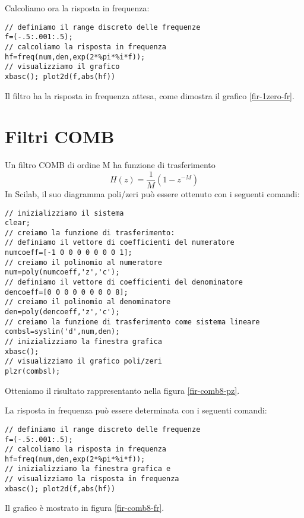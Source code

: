 Calcoliamo ora la risposta in frequenza:
\begin{verbatim}
// definiamo il range discreto delle frequenze
f=(-.5:.001:.5);
// calcoliamo la risposta in frequenza
hf=freq(num,den,exp(2*%pi*%i*f));
// visualizziamo il grafico
xbasc(); plot2d(f,abs(hf))
\end{verbatim}
Il filtro ha la risposta in frequenza attesa, come dimostra il grafico \ref{fir-1zero-fr}.


\section{Filtri COMB}
Un filtro COMB di ordine M ha funzione di trasferimento 
\begin{displaymath}
H(z)=\frac{1}{M}(1-z^{-M})
\end{displaymath}
In Scilab, il suo diagramma poli/zeri pu\`o essere ottenuto con i seguenti comandi:
\begin{verbatim}
// inizializziamo il sistema
clear;
// creiamo la funzione di trasferimento:
// definiamo il vettore di coefficienti del numeratore
numcoeff=[-1 0 0 0 0 0 0 0 1];
// creiamo il polinomio al numeratore
num=poly(numcoeff,'z','c');
// definiamo il vettore di coefficienti del denominatore
dencoeff=[0 0 0 0 0 0 0 0 8];
// creiamo il polinomio al denominatore
den=poly(dencoeff,'z','c');
// creiamo la funzione di trasferimento come sistema lineare
combsl=syslin('d',num,den);
// inizializziamo la finestra grafica
xbasc();
// visualizziamo il grafico poli/zeri
plzr(combsl);
\end{verbatim}
Otteniamo il risultato rappresentanto nella figura \ref{fir-comb8-pz}.


La risposta in frequenza pu\`o essere determinata con i seguenti comandi:
\begin{verbatim}
// definiamo il range discreto delle frequenze
f=(-.5:.001:.5);
// calcoliamo la risposta in frequenza
hf=freq(num,den,exp(2*%pi*%i*f));
// inizializziamo la finestra grafica e 
// visualizziamo la risposta in frequenza
xbasc(); plot2d(f,abs(hf))
\end{verbatim}
Il grafico \`e mostrato in figura \ref{fir-comb8-fr}.
 

